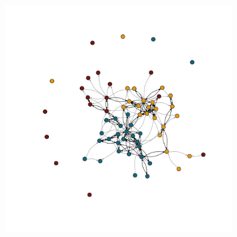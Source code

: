 \documentclass[Afour,sageh,times]{sagej}
\begin{document}
\begin{figure}[t]
\includegraphics[trim={0 4cm 0 5.5cm},clip,width=0.9\textwidth]{Figures/Example}
\end{figure}
\end{document}
